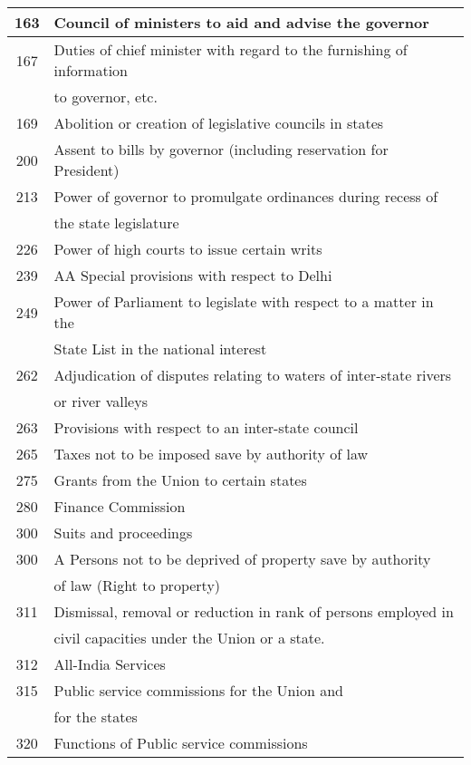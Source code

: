 \begin{longtable}[c]{@{}|c|l|@{}}
  163 & Council of ministers to aid and advise the governor \\ \midrule
  167 & Duties of chief minister with regard to the furnishing of information\\
      & to governor, etc. \\ \midrule
  169 & Abolition or creation of legislative councils in states \\ \midrule
  200 & Assent to bills by governor (including reservation for President) \\ \midrule
  213 & Power of governor to promulgate ordinances during recess of\\
      & the state legislature \\ \midrule
  226 & Power of high courts to issue certain writs \\ \midrule
  239 & AA Special provisions with respect to Delhi \\ \midrule
  249 & Power of Parliament to legislate with respect  to a matter in the\\
      & State List in the national interest \\ \midrule
  262 & Adjudication of disputes relating to waters of inter-state rivers\\
      & or river valleys \\ \midrule
  263 & Provisions with respect to an inter-state council \\ \midrule
  265 & Taxes not to be imposed save by authority of law \\ \midrule
  275 & Grants from the Union to certain states \\ \midrule
  280 & Finance Commission \\ \midrule
  300 & Suits and proceedings \\ \midrule
  300 & A Persons not to be deprived of property save by authority\\
      & of law (Right to property) \\ \midrule
  311 & Dismissal, removal or reduction in rank of persons employed in\\
      & civil capacities under the Union or a state. \\ \midrule
  312 & All-India Services \\ \midrule
  315 & Public service commissions for the Union and\\
      & for the states \\ \midrule
  320 & Functions of Public service commissions \\ \midrule

\end{longtable}

